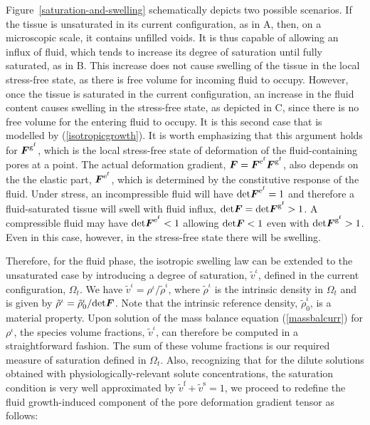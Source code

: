Figure~\ref{saturation-and-swelling} schematically depicts two possible
scenarios. If the tissue is unsaturated in its current configuration,
as in A, then, on a microscopic scale, it 
contains unfilled voids. It is thus capable of allowing an influx of
fluid, which tends to increase its degree of saturation until fully
saturated, as in  B. This increase 
does not cause swelling of the tissue in the local stress-free state, as
there is free volume for 
incoming fluid to occupy. However, once the tissue is
saturated in the current configuration, an increase in the
fluid content causes swelling in the stress-free state, as depicted in
C, since there is no free volume for the 
entering fluid to occupy. It is this second case that is modelled by
(\ref{isotropicgrowth}). It is worth emphasizing that this argument
holds for $\mbox{\boldmath$ F$}^{\mathrm{g}^\mathrm{f}}$, which is the local
stress-free state of deformation of the fluid-containing pores at a point. The
actual deformation gradient, $\mbox{\boldmath$ F$} =
\mbox{\boldmath$ F$}^{\mathrm{e}^\mathrm{f}}\mbox{\boldmath$ F$}^{\mathrm{g}^\mathrm{f}}$, also depends
on the the elastic part, $\mbox{\boldmath$ F$}^{\mathrm{e}^\mathrm{f}}$, which is
determined by the constitutive response of the fluid. Under stress, an
incompressible fluid will have
$\mathrm{det}\mbox{\boldmath$ F$}^{\mathrm{e}^\mathrm{f}} = 1$ and therefore a
fluid-saturated tissue will swell with fluid influx, $\mathrm{det}\mbox{\boldmath$ F$}
= \mathrm{det}\mbox{\boldmath$ F$}^{\mathrm{g}^\mathrm{f}} > 1$. A compressible fluid
may have $\mathrm{det}\mbox{\boldmath$ F$}^{\mathrm{e}^\mathrm{f}} < 1$ allowing
$\mathrm{det}\mbox{\boldmath$ F$} < 1$ even with
$\mathrm{det}\mbox{\boldmath$ F$}^{\mathrm{g}^\mathrm{f}} >1$. Even in this case,
however, in the stress-free state there will be swelling.

Therefore, for the fluid phase, the isotropic swelling law can be
extended to the unsaturated case by 
introducing a degree of saturation, $\tilde{v}^\iota$, defined in the
current configuration, $\Omega_t$. We have $\tilde{v}^\iota =
\rho^\iota/\tilde{\rho}^\iota$, where 
$\tilde{\rho}^\iota$ is the intrinsic density in $\Omega_t$ and is
given by $\tilde{\rho}^\iota =
\tilde{\rho}^\iota_0/\mathrm{det}\mbox{\boldmath$ F$}$. Note that the intrinsic
reference density, $\tilde{\rho}^\iota_0$, is a material property. Upon
solution of the 
mass balance equation (\ref{massbalcurr}) for $\rho^\iota$, the
species volume fractions, $\tilde{v}^\iota$, can therefore be computed
in a straightforward fashion. The sum of these
volume fractions is our required measure of saturation defined in
$\Omega_t$. Also, recognizing
that for the dilute solutions obtained with
physiologically-relevant solute concentrations, the saturation
condition is very well approximated by $\tilde{v}^\mathrm{f} +
\tilde{v}^\mathrm{s} = 1$, we proceed to
redefine the fluid growth-induced component of the pore deformation gradient
tensor as follows:

